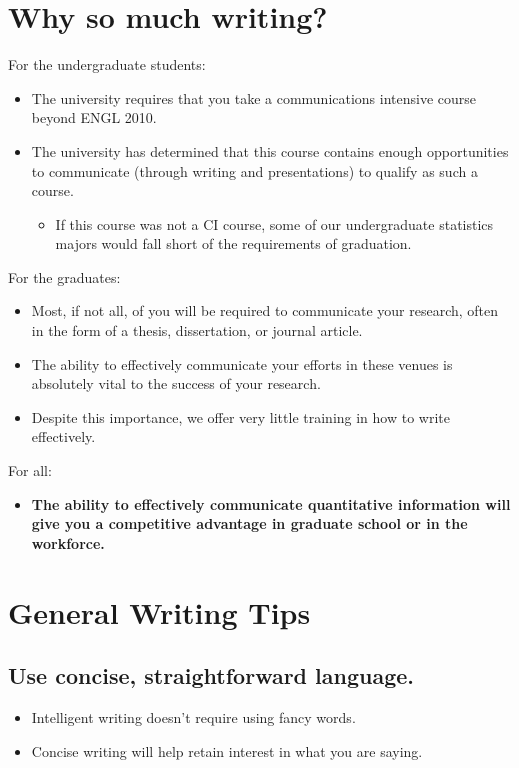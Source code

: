 \documentclass[12pt]{notes}
\begin{document}

\section{Why so much writing?}
For the undergraduate students:
\begin{itemize}
\item The university requires that you take a communications intensive course beyond ENGL 2010.
\item The university has determined that this course contains enough opportunities to communicate (through writing and presentations) to qualify as such a course. 
\begin{itemize}
\item If this course was not a CI course, some of our undergraduate statistics majors would fall short of the requirements of graduation. 
\end{itemize}
\end{itemize}

For the graduates: 
\begin{itemize}
\item Most, if not all, of you will be required to communicate your research, often in the form of a thesis, dissertation, or journal article. 
\item The ability to effectively communicate your efforts in these venues is absolutely vital to the success of your research. 
\item Despite this importance, we offer very little training in how to write effectively. 
\end{itemize}

For all:
\begin{itemize}
\item \textbf{The ability to effectively communicate quantitative information will give you a competitive advantage in graduate school or in the workforce.} 
\end{itemize}

\section{General Writing Tips}

\subsection*{Use concise, straightforward language.}
\begin{itemize}
\item Intelligent writing doesn't require using fancy words. 
\item Concise writing will help retain interest in what you are saying. 
\end{itemize}
\end{document}

